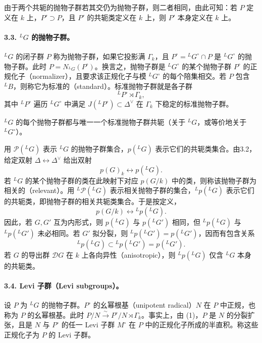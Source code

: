 由于两个共轭的抛物子群若其交仍为抛物子群，则二者相同，由此可知：若 $P$ 定义在 $k$ 上，$P'\supset P$，且 $P'$ 的共轭类定义在 $k$ 上，则 $P'$ 本身定义在 $k$ 上。

\paragraph*{3.3. ${}^LG$ 的抛物子群。}
${}^LG$ 的闭子群 $P$ 称为抛物子群，如果它投影满 $\Gamma_k$，且 $P^\circ={}^LG^\circ\cap P$ 是 ${}^LG^\circ$ 的抛物子群。此时 $P=N_{{}^LG}(P^\circ)$。换言之，抛物子群是 ${}^LG^\circ$ 的某个抛物子群 $P^\circ$ 的正规化子（normalizer），且要求该正规化子与模 ${}^LG^\circ$ 的每个陪集相交。若 $P$ 包含 ${}^LB$，则称它为标准的（standard）。标准抛物子群就是各子群
\begin{equation}
 {}^LP^\circ\rtimes\Gamma_k,\tag{1}
\end{equation}
其中 ${}^LP^\circ$ 遍历 ${}^LG^\circ$ 中满足 $J({}^LP^\circ)\subset\Delta^\vee$ 在 $\Gamma_k$ 下稳定的标准抛物子群。

${}^LG$ 的每个抛物子群都与唯一一个标准抛物子群共轭（关于 ${}^LG$，或等价地关于 ${}^LG^\circ$）。

用 $\mathcal P({}^LG)$ 表示 ${}^LG$ 的抛物子群集合，$p({}^LG)$ 表示它们的共轭类集合。由3.2，给定双射 $\Delta\leftrightarrow\Delta^\vee$ 给出双射
\begin{equation}
 p(G)_k\longleftrightarrow p({}^LG).\tag{2}
\end{equation}
若 ${}^LG$ 的某个抛物子群的类在此映射下对应 $p(G/k)$ 中的类，则称该抛物子群为相关的（relevant）。用 ${}^L\mathcal P({}^LG)$ 表示相关抛物子群的集合，${}^Lp({}^LG)$ 表示它们的共轭类，即抛物子群的相关共轭类集合。于是按定义，
\begin{equation}
 p(G/k)\longleftrightarrow{}^Lp({}^LG).\tag{3}
\end{equation}
因此，若 $G,G'$ 互为内形式，则 $p({}^LG)$ 与 $p({}^LG')$ 相同，但 ${}^Lp({}^LG)$ 与 ${}^Lp({}^LG')$ 未必相同。若 $G'$ 拟分裂，则 ${}^Lp({}^LG')=p({}^LG')$，因而有包含关系
\begin{equation}
 {}^Lp({}^LG)\subset{}^Lp({}^LG')=p({}^LG').\tag{4}
\end{equation}
若 $G$ 的导出群 $\mathcal DG$ 在 $k$ 上各向异性（anisotropic），则 ${}^Lp({}^LG)$ 仅含 ${}^LG$ 本身的共轭类。

\paragraph*{3.4. Levi 子群（Levi subgroups）。}
设 $P$ 为 ${}^LG$ 的抛物子群。$P^\circ$ 的幺幂根基（unipotent radical）$N$ 在 $P$ 中正规，也称为 $P$ 的幺幂根基。此时 $P/N\xrightarrow{\sim}P^\circ/N\rtimes\Gamma_k$。事实上，由 (1)，$P$ 是 $N$ 的分裂扩张，且是 $N$ 与 $P^\circ$ 的任一 Levi 子群 $M^\circ$ 在 $P$ 中的正规化子所成的半直积。称这些正规化子为 $P$ 的 Levi 子群。

